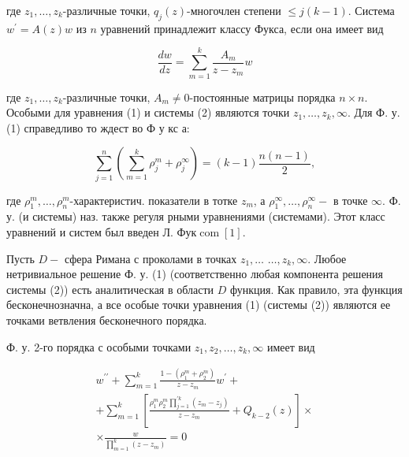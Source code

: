 \documentclass[10pt]{article}
\begin{document}
где $z_{1}, \ldots, z_{k}$-различные точки, $q_{j}(z)$-многочлен степени $\leqslant j(k-1)$. Система $w^{\prime}=A(z) w$ из $n$ уравнений принадлежит классу Фукса, если она имеет вид



\[

\frac{d w}{d z}=\sum_{m=1}^{k} \frac{A_{m}}{z-z_{m}} w

\]



где $z_{1}, \ldots, z_{k}$-различные точки, $A_{m} \neq 0$-постоянные матрицы порядка $n \times n$. Особыми для уравнения (1) и системы (2) являются точки $z_{1}, \ldots, z_{k}, \infty$. Для Ф. у. (1) справедливо то ждест во Ф у кс а:



\[

\sum_{j=1}^{n}\left(\sum_{m=1}^{k} \rho_{j}^{m}+\rho_{j}^{\infty}\right)=(k-1) \frac{n(n-1)}{2},

\]



где $\rho_{1}^{m}, \ldots, \rho_{n}^{m}$-характеристич. показатели в тотке $z_{m}$, а $\rho_{1}^{\infty}, \ldots, \rho_{n}^{\infty}-$ в точке $\infty$. Ф. у. (и системы) наз. также регуля рными уравнениями (системами). Этот класс уравнений и систем был введен Л. Фук$\operatorname{com}[1]$.



Пусть $D-$ сфера Римана с проколами в точках $z_{1}, \ldots$ $\ldots, z_{k}, \infty$. Любое нетривиальное решение Ф. у. (1) (соответственно любая компонента решения системы (2)) есть аналитическая в области $D$ функция. Как правило, эта функция бесконечнозначна, а все особые точки уравнения (1) (системы (2)) являются ее точками ветвления бесконечного порядка.



Ф. у. 2-го порядка с особыми точками $z_{1}, z_{2}, \ldots, z_{k}, \infty$ имеет вид



\[

\begin{gathered}

w^{\prime \prime}+\sum_{m=1}^{k} \frac{1-\left(\rho_{1}^{m}+\rho_{2}^{m}\right)}{z-z_{m}} w^{\prime}+ \\

+\sum_{m=1}^{k}\left[\frac{\rho_{1}^{m} \rho_{2}^{m} \prod_{j=1}^{\prime k}\left(z_{m}-z_{j}\right)}{z-z_{m}}+Q_{k-2}(z)\right] \times \\

\times \frac{w}{\prod_{m=1}^{k}\left(z-z_{m}\right)}=0

\end{gathered}

\]
\end{document}
